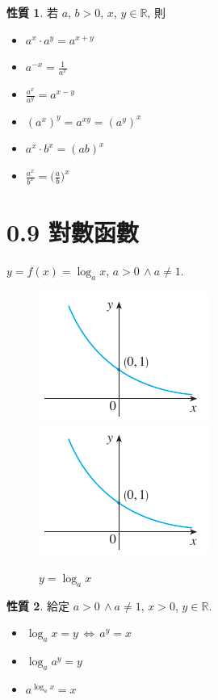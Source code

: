 \documentclass[12pt]{extarticle}
\newcommand{\ds}{\displaystyle}
\newcommand{\ifff}{\,\Longleftrightarrow\,}
\theoremstyle{definition}
\newtheorem*{prp}{性質}
\newcommand{\myline}{\noindent\makebox[\linewidth]{\rule{\paperwidth}{0.4pt}}}
\begin{document}
\vspace{-5mm}
\begin{prp} 若 $a$, $b > 0$, $x$, $y\in\mathbb{R}$, 則
  \setlength{\columnsep}{-0mm}
  \begin{multicols}{3}
    \begin{itemize}\setlength\itemsep{0em}
      \item $\ds a^x\cdot a^y = a^{x + y}$
      \item $\ds a^{-x} = \frac{1}{a^x}$
      \item $\ds\frac{a^x}{a^y} = a^{x - y}$
      \item $\ds (a^x)^y = a^{xy} = (a^y)^x$
      \item $\ds a^x\cdot b^x = (ab)^x$
      \item $\ds\frac{a^x}{b^x} = \Big(\frac{a}{b}\Big)^x$
    \end{itemize}
  \end{multicols}
\end{prp}

\myline

\section*{0.9 對數函數}

$y = f(x) = \log_a x$, $a > 0\,\wedge a\not=1$. 

\begin{figure}[!htbp]
  \centering
  \includegraphics[width=.3\textwidth,page=3]{fig/power.pdf}\hspace{2cm}
  \includegraphics[width=.3\textwidth,page=4]{fig/power.pdf}
  \caption{$y = \log_a x$}
\end{figure}

\begin{prp} 給定 $a > 0\,\wedge a\not=1$, $x > 0$, $y\in\mathbb{R}$. 
  \setlength{\columnsep}{-0mm}
  \begin{multicols}{3}
    \begin{itemize}\setlength\itemsep{0em}
      \item $\log_a x = y \ifff a^y = x$
      \item $\ds\log_a a^y = y$
      \item $\ds a^{\log_a x} = x$
    \end{itemize}
  \end{multicols}
\end{prp}
\end{document}
